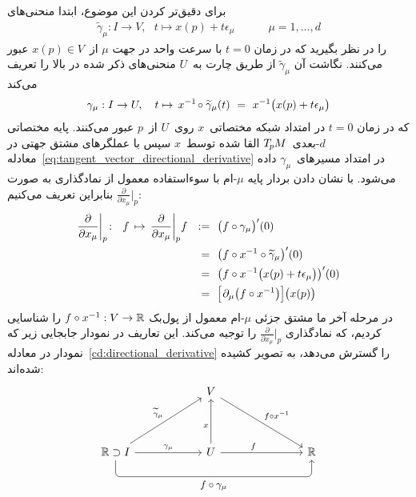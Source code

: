 برای دقیق‌تر کردن این موضوع، ابتدا منحنی‌های
\begin{align}
	\widetilde{\gamma}_\mu: I \to V,\ \ \ t \mapsto x(p) + t \epsilon_\mu \quad\qquad \mu = 1,\dots,d
\end{align}
را در نظر بگیرید که در زمان $t=0$ با سرعت واحد در جهت $\mu$ از~$x(p) \in V$ عبور می‌کنند.
نگاشت آن $\widetilde{\gamma}_\mu$ از طریق چارت به~$U$ منحنی‌های ذکر شده در بالا را تعریف می‌کند
\begin{align}
	\gamma_\mu: I \to U,\ \ \ t \mapsto\,
	x^{-1}\mkern-2mu \circ \widetilde{\gamma}_\mu (t) \ =\ 
	x^{-1} \big( x(p) + t \epsilon_\mu \big)
\end{align}
که در زمان $t=0$ در امتداد شبکه مختصاتی~$x$ روی~$U$ از~$p$ عبور می‌کنند.
پایه مختصاتی $d$-بعدی~$T_{\mkern-1.5mu p}\mkern-.5muM$ القا شده توسط~$x$ سپس با عملگرهای مشتق جهتی در معادله~\eqref{eq:tangent_vector_directional_derivative} در امتداد مسیرهای~$\gamma_\mu$ داده می‌شود.
با نشان دادن بردار پایه $\mu$-ام با سوءاستفاده معمول از نمادگذاری به صورت $\frac{\partial}{\partial x_\mu}\big|_p$ بنابراین تعریف می‌کنیم:
\begin{align}\label{eq:coord_basis_def}
	\frac{\partial}{\partial x_\mu} \bigg|_p \!:\ \ f\, \mapsto\,
	\frac{\partial}{\partial x_\mu} \bigg|_p f
	\ \ :=&\ \ \big(f \circ \gamma_\mu \big)'(0) \notag \\
	\ \  =&\ \ \big(f \circ x^{-1} \circ \widetilde{\gamma}_\mu \big)'(0) \notag \\
	\ \  =&\ \ \big(f \circ x^{-1}\big( x(p) + t\epsilon_\mu \big) \big)'(0) \notag \\
	\ \  =&\ \ \pig[\mkern1.5mu \partial_\mu \big(f \circ x^{-1} \big)\pig] \big(x(p)\big)
\end{align}
در مرحله آخر ما مشتق جزئی $\mu$-ام معمول از پول‌بک $f\circ x^{-1}: V \to \mathbb{R}$ را شناسایی کردیم، که نمادگذاری $\frac{\partial}{\partial x_\mu}\big|_p$ را توجیه می‌کند.
این تعاریف در نمودار جابجایی زیر که نمودار در معادله~\eqref{cd:directional_derivative} را گسترش می‌دهد، به تصویر کشیده شده‌اند:
\begin{equation}
	\begin{tikzcd}[row sep=4.em, column sep=6.em]
		& V     \arrow[rd, "{f\circ x^{-1}}"]
		\\
		\R \supset I
		\arrow[r, "\gamma_\mu"]
		\arrow[ru, "\widetilde{\gamma}_\mu"]
		\arrow[rr, rounded corners, to path={ 
			|- node[below, pos=.75]{\small$f \circ \gamma_\mu$} ([yshift=-3.5ex]\tikztotarget.south)
			-- (\tikztotarget.south)
		}]
		& U     \arrow[r, pos=.4, "f"]
		\arrow[u, pos=.4, "x"]
		&[1.4em] \R
	\end{tikzcd}
\end{equation}




